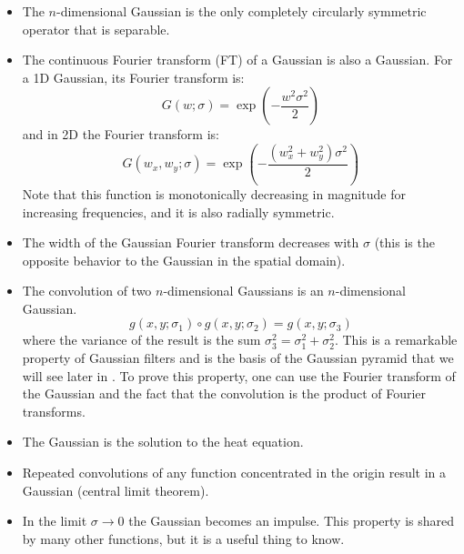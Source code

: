 \begin{itemize}
	\item The $n$-dimensional Gaussian is the only completely circularly symmetric operator that is separable.

	\item The continuous Fourier transform (FT) of a Gaussian is also a Gaussian. For a 1D Gaussian, its Fourier transform is:
	      \begin{equation}
		      G (w; \sigma) = \exp{ \left( -\frac{w^2 \sigma^2} {2} \right) }
	      \end{equation}
	      and in 2D the Fourier transform is:
	      \begin{equation}
		      G (w_x, w_y; \sigma) = \exp{ \left(- \frac{(w_x^2+w_y^2) \sigma^2} {2} \right) }
		      \label{eq:FTgauss2d}
	      \end{equation}
	      Note that this function is monotonically decreasing in magnitude for increasing frequencies, and it is also radially symmetric.

	\item The width of the Gaussian Fourier transform decreases with $\sigma$ (this is the opposite behavior to the Gaussian in the spatial domain).

	\item The convolution of two $n$-dimensional Gaussians is an $n$-dimensional Gaussian.
	      \begin{equation}
		      g (x,y; \sigma_1 ) \circ g (x,y; \sigma_2)  = g (x,y; \sigma_3)
	      \end{equation}
	      where the variance of the result is the sum $\sigma_3^2 = \sigma_1^2 + \sigma_2^2$. This is a remarkable property of Gaussian filters and is the basis of the Gaussian pyramid that we will see later in \chap{\ref{chapter:image_pyramids}}. To prove this property, one can use the Fourier transform of the Gaussian and the fact that the convolution is the product of Fourier transforms.

	\item The Gaussian is the solution to the heat equation.

	\item Repeated convolutions of any function concentrated in the origin result in a Gaussian (central limit theorem).

	\item In the limit $\sigma \rightarrow 0$ the Gaussian becomes an impulse. This property is shared by many other functions, but it is a useful thing to know.
\end{itemize}

